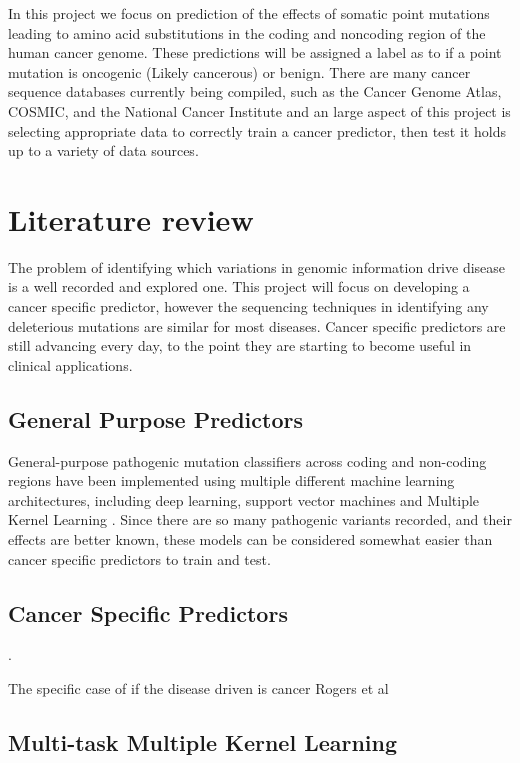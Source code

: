\documentclass[11pt]{article}
\begin{document}
In this project we focus on prediction of the effects of somatic point mutations leading to amino acid substitutions\cite{Shihab2013} in the coding and noncoding region of the human cancer genome. These predictions will be assigned a label as to if a point mutation is oncogenic (Likely cancerous) or benign. There are many cancer sequence databases currently being compiled, such as the Cancer Genome Atlas, COSMIC, and the National Cancer Institute and an large aspect of this project is selecting appropriate data to correctly train a cancer predictor, then test it holds up to a variety of data sources.

\section{Literature review}

The problem of identifying which variations in genomic information drive disease is a well recorded and explored one. This project will focus on developing a cancer specific predictor, however the sequencing techniques in identifying any deleterious mutations are similar for most diseases. Cancer specific predictors are still advancing every day, to the point they are starting to become useful in clinical applications\cite{DiResta2018}.

\subsection{General Purpose Predictors}

General-purpose pathogenic mutation classifiers across coding and non-coding regions have been implemented using multiple different machine learning architectures, including deep learning\cite{Quang2015}, support vector machines \cite{Kircher2014} and Multiple Kernel Learning \cite{Shihab2015}. Since there are so many pathogenic variants recorded, and their effects are better known, these models can be considered somewhat easier than cancer specific predictors to train and test.


\subsection{Cancer Specific Predictors}

 \cite{Rogers2017,Quang2015,Shihab2013}. 

The specific case of if the disease driven is cancer
Rogers et al \cite{Rogers2017}


\subsection{Multi-task Multiple Kernel Learning}
\end{document}
